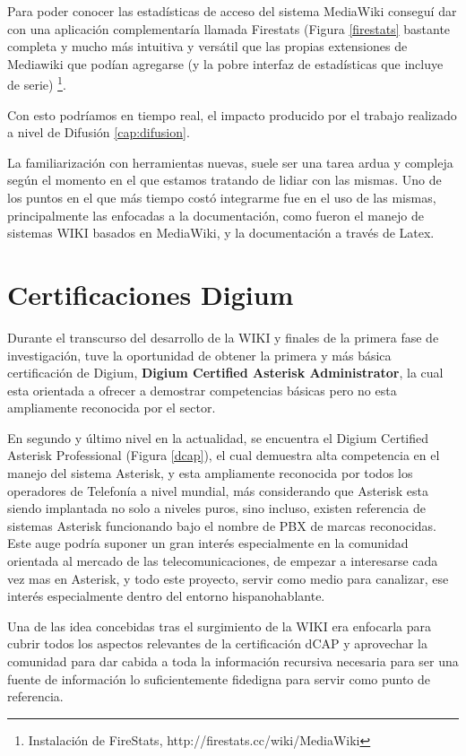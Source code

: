 Para poder conocer las estadísticas de acceso del sistema MediaWiki conseguí dar con una aplicación complementaría llamada Firestats \cite{website:firestats} (Figura \ref{firestats} bastante completa y mucho más intuitiva y versátil que las propias extensiones de Mediawiki que podían agregarse (y la pobre interfaz de estadísticas que incluye de serie) \footnote{Instalación de FireStats, http://firestats.cc/wiki/MediaWiki}.

Con esto podríamos en tiempo real, el impacto producido por el trabajo realizado a nivel de Difusión \ref{cap:difusion}.

La familiarización con herramientas nuevas, suele ser una tarea ardua y compleja según el momento en el que estamos tratando de lidiar con las mismas.
Uno de los puntos en el que más tiempo costó integrarme fue en el uso de las mismas, principalmente las enfocadas a la documentación, como fueron el manejo de sistemas WIKI basados en MediaWiki, y la documentación a través de Latex. 


\section*{Certificaciones Digium}

Durante el transcurso del desarrollo de la WIKI y finales de la primera fase de investigación, tuve la oportunidad de obtener la primera y más básica certificación de Digium, \textbf{Digium Certified Asterisk Administrator}, la cual esta orientada a ofrecer a demostrar competencias básicas pero no esta ampliamente reconocida por el sector.

En segundo y último nivel en la actualidad, se encuentra el Digium Certified Asterisk Professional (Figura \ref{dcap}), el cual demuestra alta competencia en el manejo del sistema Asterisk, y esta ampliamente reconocida por todos los operadores de Telefonía a nivel mundial, más considerando que Asterisk esta siendo implantada no solo a niveles puros, sino incluso, existen referencia de sistemas Asterisk funcionando bajo el nombre de PBX de marcas reconocidas. Este auge podría suponer un gran interés especialmente en la comunidad orientada al mercado de las telecomunicaciones, de empezar a interesarse cada vez mas en Asterisk, y todo este proyecto, servir como medio para canalizar, ese interés especialmente dentro del entorno hispanohablante.

Una de las idea concebidas tras el surgimiento de la WIKI era enfocarla para cubrir todos los aspectos relevantes de la certificación dCAP y aprovechar la comunidad para dar cabida a toda la información  recursiva necesaria para ser una fuente de información lo suficientemente fidedigna para servir como punto de referencia.

